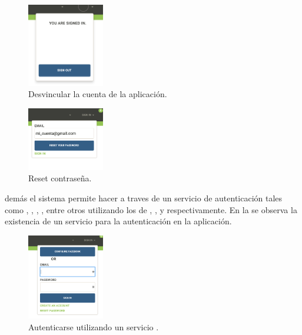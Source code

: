 \begin{figure}[H]
	\centering
	\includegraphics[width=0.3\textwidth]{figuras/accounts/log_out.png}

	\caption{Desvincular la cuenta de la aplicación.}
	\label{figure:account:log_out}
\end{figure}

\begin{figure}[H]
	\centering
	\includegraphics[width=0.3\textwidth]{figuras/accounts/reset_password.png}

	\caption{Reset contraseña.}
	\label{figure:account:reset_password}
\end{figure}

demás el sistema permite hacer \loginCPT a traves de un servicio de autenticación \thirdParty tales como \facebook, \googleNAME, \twitterNAME, \gitHubNAME, entre otros utilizando los \packagesAS de \meteorNAME \accountFacebook, \accountGoogle, \accountTwitter y \accountGithub respectivamente. En la  se observa la existencia de un servicio \thirdParty para la autenticación en la aplicación.


\begin{figure}[H]
	\centering
	\includegraphics[width=0.3\textwidth]{figuras/accounts/log_in_plus_facebook.png}

	\caption{Autenticarse utilizando un servicio \thirdParty.}
	\label{figure:account:log_in_plus_facebook}
\end{figure}

